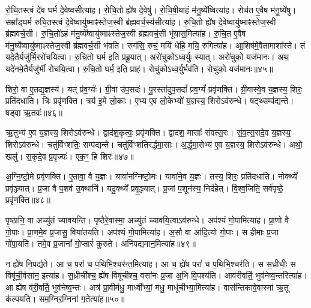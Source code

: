 रो॒चि॒तस्त्वं दे॑व घर्म दे॒वेष्वसीत्या॑ह। 
रो॒चि॒तो ह्ये॑ष दे॒वेषु॑। 
रो॒चि॒षी॒याहं म॑नु॒ष्ये᳚ष्वित्या॑ह। 
रोच॑त ए॒वैष म॑नु॒ष्ये॑षु। 
सम्रा᳚ड्घर्म रुचि॒तस्त्वं दे॒वेष्वायु॑ष्माꣴस्तेज॒स्वी ब्र॑ह्मवर्च॒स्य॑सीत्या॑ह। 
रु॒चि॒तो ह्ये॑ष दे॒वेष्वायु॑ष्माꣴस्तेज॒स्वी ब्र॑ह्मवर्च॒सी। 
रु॒चि॒तो॑ऽहं म॑नु॒ष्ये᳚ष्वायु॑ष्माꣴस्तेज॒स्वी ब्र॑ह्मवर्च॒सी भू॑यास॒मित्या॑ह। 
रु॒चि॒त ए॒वैष म॑नु॒ष्ये᳚ष्वायु॑ष्माꣴस्तेज॒स्वी ब्र॑ह्मवर्च॒सी भ॑वति। 
रुग॑सि॒ रुचं॒ मयि॑ धेहि॒ मयि॒ रुगित्या॑ह। 
आ॒शिष॑मे॒वैतामाशा᳚स्ते। 
तं यदे॒तैर्यजु॑र्भि॒ररो॑चयित्वा। 
रु॒चि॒तो घ॒र्म इति॑ प्रब्रू॒यात्। 
अरो॑चुकोऽध्व॒र्युः स्यात्। 
अरो॑चुको॒ यज॑मानः। 
अथ॒ यदे॑नमे॒तैर्यजु॑र्भी रोचयि॒त्वा। 
रु॒चि॒तो घर्म॒ इति॒ प्राह॑। 
रोचु॑कोऽध्व॒र्युर्भव॑ति। 
रोचु॑को॒ यज॑मानः॥४५॥
\anuvakamend[प॒श्चाद्रो॑चयति॒ जाग॑तेन॒ छन्द॑सा॒ पाङ्क्ते॑न॒ छन्द॑सा॒ समा॑रुचि॒तो रो॑च॒येत्या॑हा॒शिष॑मे॒वैतामाशा᳚स्ते शास्ते॒ऽष्टौ च॑]

शिरो॒ वा ए॒तद्य॒ज्ञस्य॑। 
यत् प्र॑व॒र्ग्यः॑। 
ग्री॒वा उ॑प॒सदः॑। 
पु॒रस्ता॑दुप॒सदां᳚ प्रव॒र्ग्यं॑ प्रवृ॑णक्ति। 
ग्री॒वास्वे॒व य॒ज्ञस्य॒ शिरः॒ प्रति॑दधाति। 
त्रिः प्रवृ॑णक्ति। 
त्रय॑ इ॒मे लो॒काः। 
ए॒भ्य ए॒व लो॒केभ्यो॑ य॒ज्ञस्य॒ शिरोऽव॑रुन्धे। 
षट्थ्सम्प॑द्यन्ते। 
षड्वा ऋ॒तवः॑॥४६॥

ऋ॒तुभ्य॑ ए॒व य॒ज्ञस्य॒ शिरोऽव॑रुन्धे। 
द्वाद॑श॒कृत्वः॒ प्रवृ॑णक्ति। 
द्वाद॑श॒ मासाः᳚ संवत्स॒रः। 
सं॒व॒त्स॒रादे॒व य॒ज्ञस्य॒ शिरोऽव॑रुन्धे। 
चतु॑र्विꣳशतिः॒ सम्प॑द्यन्ते। 
चतु॑र्विꣳशतिरर्द्धमा॒साः। 
अ॒र्द्ध॒मा॒सेभ्य॑ ए॒व य॒ज्ञस्य॒ शिरोऽव॑रुन्धे। 
अथो॒ खलु॑। 
स॒कृदे॒व प्र॒वृज्यः॑। 
एक॒ꣳ॒ हि शिरः॑॥४७॥

अ॒ग्नि॒ष्टो॒मे प्रवृ॑णक्ति। 
ए॒तावा॒\an{} वै य॒ज्ञः। 
यावा॑नग्निष्टो॒मः। 
यावा॑ने॒व य॒ज्ञः। 
तस्य॒ शिरः॒ प्रति॑दधाति। 
नोक्थ्ये᳚ प्रवृ॑ञ्ज्यात्। 
प्र॒जा वै प॒शव॑ उ॒क्थानि॑। 
यदु॒क्थ्ये᳚ प्रवृ॒ञ्ज्यात्। 
प्र॒जां प॒शून॑स्य॒ निर्द॑हेत्। 
वि॒श्व॒जिति॒ सर्व॑पृष्ठे॒ प्रवृ॑णक्ति॥४८॥

पृ॒ष्ठानि॒ वा अच्यु॑तं च्यावयन्ति। 
पृ॒ष्ठैरे॒वास्मा॒ अच्यु॑तं च्यावयि॒त्वाऽव॑रुन्धे। 
अप॑श्यं गो॒पामित्या॑ह। 
प्रा॒णो वै गो॒पाः। 
प्रा॒णमे॒व प्र॒जासु॒ विया॑तयति। 
अप॑श्यं गो॒पामित्या॑ह। 
अ॒सौ वा आ॑दि॒त्यो गो॒पाः। 
स हीमाः प्र॒जा गो॑पा॒यति॑। 
तमे॒व प्र॒जानां᳚ गो॒प्तारं॑ कुरुते। 
अनि॑पद्यमान॒मित्या॑ह॥४९॥

न ह्ये॑ष नि॒पद्य॑ते। 
आ च॒ परा॑ च प॒थिभि॒श्चर॑न्त॒मित्या॑ह। 
आ च॒ ह्ये॑ष परा॑ च प॒थिभि॒श्चर॑ति। 
स स॒ध्रीचीः॒ स विषू॑ची॒र्वसा॑न॒ इत्या॑ह। 
स॒ध्रीची᳚श्च॒ ह्ये॑ष विषू॑चीश्च॒ वसा॑नः प्र॒जा अ॒भि वि॒पश्य॑ति। 
आव॑रीवर्ति॒ भुव॑नेष्व॒न्तरित्या॑ह। 
आ ह्ये॑ष व॑री॒वर्ति॒ भुव॑नेष्व॒न्तः। 
अत्र॑ प्रा॒वीर्मधु॒ माध्वी᳚भ्यां॒ मधु॒ माधू॑चीभ्या॒मित्या॑ह। 
वास॑न्तिकावे॒वास्मा॑ ऋ॒तू क॑ल्पयति। 
सम॒ग्निर॒ग्निना॑ ग॒तेत्या॑ह॥५०॥

